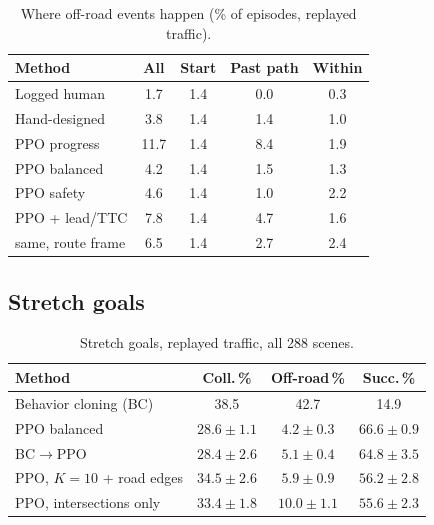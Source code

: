 \documentclass[conference]{IEEEtran}
\newcommand{\pp}{\phantom{0}}
\begin{document}
\begin{table}[t]
\caption{Where off-road events happen (\% of episodes, replayed traffic).}\label{tab:offroad}
\centering\small
\begin{tabular}{@{}lcccc@{}}
\toprule
Method & All & Start & Past path & Within \\
\midrule
Logged human & \pp1.7 & 1.4 & 0.0 & 0.3 \\
Hand-designed & \pp3.8 & 1.4 & 1.4 & 1.0 \\
PPO progress & 11.7 & 1.4 & 8.4 & 1.9 \\
PPO balanced & \pp4.2 & 1.4 & 1.5 & 1.3 \\
PPO safety & \pp4.6 & 1.4 & 1.0 & 2.2 \\
PPO + lead/TTC & \pp7.8 & 1.4 & 4.7 & 1.6 \\
\quad same, route frame & \pp6.5 & 1.4 & 2.7 & 2.4 \\
\bottomrule
\end{tabular}
\end{table}

\subsection{Stretch goals}

\begin{table}[t]
\caption{Stretch goals, replayed traffic, all 288 scenes.}\label{tab:stretch}
\centering\small
\begin{tabular}{@{}lccc@{}}
\toprule
Method & Coll.\,\% & Off-road\,\% & Succ.\,\% \\
\midrule
Behavior cloning (BC) & 38.5 & 42.7 & 14.9 \\
PPO balanced & $28.6\pm1.1$ & $4.2\pm0.3$ & $66.6\pm0.9$ \\
BC$\rightarrow$PPO & $28.4\pm2.6$ & $5.1\pm0.4$ & $64.8\pm3.5$ \\
PPO, $K{=}10$ + road edges & $34.5\pm2.6$ & $5.9\pm0.9$ & $56.2\pm2.8$ \\
PPO, intersections only & $33.4\pm1.8$ & $10.0\pm1.1$ & $55.6\pm2.3$ \\
\bottomrule
\end{tabular}
\end{table}
\end{document}
